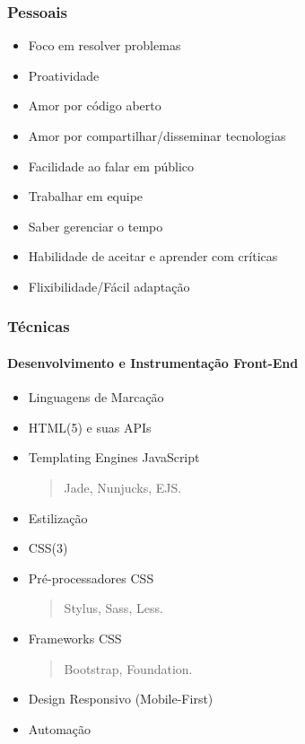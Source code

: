 \documentclass[]{article}
\providecommand{\tightlist}{%
  \setlength{\itemsep}{0pt}\setlength{\parskip}{0pt}}
\let\oldparagraph\paragraph
\renewcommand{\paragraph}[1]{\oldparagraph{#1}\mbox{}}
\begin{document}
\subsubsection{Pessoais}\label{pessoais}

\begin{itemize}
\tightlist
\item
  Foco em resolver problemas
\item
  Proatividade
\item
  Amor por código aberto
\item
  Amor por compartilhar/disseminar tecnologias
\item
  Facilidade ao falar em público
\item
  Trabalhar em equipe
\item
  Saber gerenciar o tempo
\item
  Habilidade de aceitar e aprender com críticas
\item
  Flixibilidade/Fácil adaptação
\end{itemize}

\subsubsection{Técnicas}\label{tuxe9cnicas}

\paragraph{Desenvolvimento e Instrumentação
Front-End}\label{desenvolvimento-e-instrumentauxe7uxe3o-front-end}

\begin{itemize}
\item
  Linguagens de Marcação
\item
  HTML(5) e suas APIs
\item
  Templating Engines JavaScript

  \begin{quote}
  Jade, Nunjucks, EJS.
  \end{quote}
\item
  Estilização
\item
  CSS(3)
\item
  Pré-processadores CSS

  \begin{quote}
  Stylus, Sass, Less.
  \end{quote}
\item
  Frameworks CSS

  \begin{quote}
  Bootstrap, Foundation.
  \end{quote}
\item
  Design Responsivo (Mobile-First)
\item
  Automação
\end{itemize}
\end{document}
